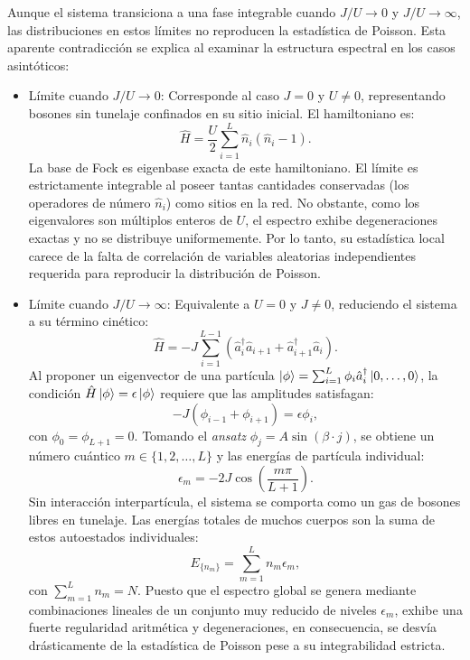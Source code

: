\documentclass[10pt,a4paper]{article}
\begin{document}
Aunque el sistema transiciona a una fase integrable cuando $J/U \rightarrow 0$ y $J/U \rightarrow \infty$, las distribuciones en estos límites no reproducen la estadística de Poisson. Esta aparente contradicción se explica al examinar la estructura espectral en los casos asintóticos:

\begin{itemize}
    \item Límite cuando $J/U \rightarrow 0$: Corresponde al caso $J=0$ y $U\neq0$, representando bosones sin tunelaje confinados en su sitio inicial. El hamiltoniano es:
\begin{equation}\label{eq:H:BHInt}
\hat{H} = \frac{U}{2}\sum_{i=1}^{L}\hat{n}_i(\hat{n}_i - 1).
\end{equation}
La base de Fock es eigenbase exacta de este hamiltoniano. El límite es estrictamente integrable al poseer tantas cantidades conservadas (los operadores de número $\hat{n}_i$) como sitios en la red. No obstante, como los eigenvalores son múltiplos enteros de $U$, el espectro exhibe degeneraciones exactas y no se distribuye uniformemente. Por lo tanto, su estadística local carece de la falta de correlación de variables aleatorias independientes requerida para reproducir la distribución de Poisson.

    \item Límite cuando $J/U \rightarrow \infty$: Equivalente a $U=0$ y $J\neq 0$, reduciendo el sistema a su término cinético:
\begin{equation}\label{eq:H:BHKin}
\hat{H} = -J \sum_{i=1}^{L-1} \!\left(\hat{a}_i^{\dagger}\hat{a}_{i+1} + \hat{a}_{i+1}^{\dagger}\hat{a}_i\right).
\end{equation}
Al proponer un eigenvector de una partícula $\ket{\phi}=\sum_{i=1}^{L}\phi_i \hat{a}_i^{\dagger}\ket{0,\dots,0}$, la condición $\hat{H}\ket{\phi}=\epsilon\ket{\phi}$ requiere que las amplitudes satisfagan:
\begin{equation}
    -J(\phi_{i-1}+\phi_{i+1})=\epsilon\phi_i,
    \label{eq:rec}
\end{equation}
con $\phi_0=\phi_{L+1}=0$. Tomando el \textit{ansatz} $\phi_j= A \sin(\beta \cdot j)$, se obtiene un número cuántico $m \in \{1, 2, \dots, L\}$ y las energías de partícula individual:
\begin{equation}\label{eq:resultado}
  \epsilon_m=-2J\cos\left(\frac{m\pi}{L+1}\right).
\end{equation}
Sin interacción interpartícula, el sistema se comporta como un gas de bosones libres en tunelaje. Las energías totales de muchos cuerpos son la suma de estos autoestados individuales:
\begin{equation}
    E_{\{n_m\}} = \sum_{m=1}^{L} n_m \epsilon_m,
\end{equation}
con $\sum_{m=1}^L n_m = N$. Puesto que el espectro global se genera mediante combinaciones lineales de un conjunto muy reducido de niveles $\epsilon_m$, exhibe una fuerte regularidad aritmética y degeneraciones, en consecuencia, se desvía drásticamente de la estadística de Poisson pese a su integrabilidad estricta.
\end{itemize}
\end{document}
